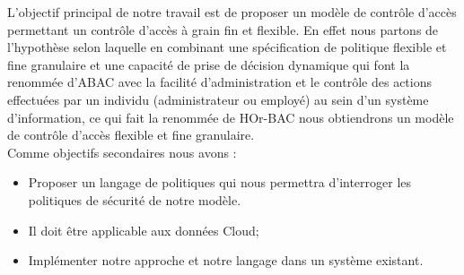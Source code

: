 L'objectif principal de notre travail est de proposer un modèle de contrôle d'accès permettant un contrôle d'accès à grain fin et flexible. En effet nous partons de l'hypothèse selon laquelle en combinant une spécification de politique flexible et fine granulaire  et une capacité de prise de décision dynamique  qui font la renommée d'ABAC avec la facilité d'administration et le contrôle des actions effectuées par un individu (administrateur ou employé) au sein d'un système d'information, ce qui fait la renommée de HOr-BAC nous obtiendrons un modèle de contrôle d'accès flexible et fine granulaire.  \\
\hspace*{0.5cm}Comme objectifs secondaires nous avons :
\begin{itemize}
\item Proposer un langage de politiques qui nous permettra d'interroger les politiques de sécurité de notre modèle.
\item Il doit être applicable  aux données Cloud;
\item Implémenter notre approche et notre langage dans un système existant.
\end{itemize}


